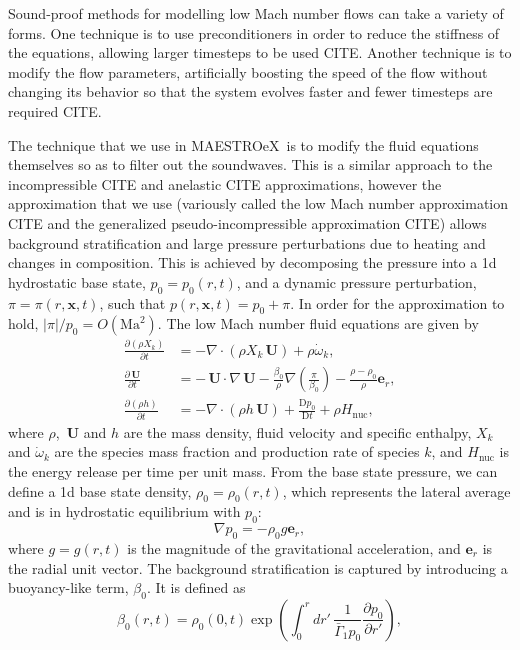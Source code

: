 \documentclass[a4paper]{jpconf}
\newcommand{\maestroex}{{\sffamily MAESTROeX}}
\newcommand{\Ub}{{\,\bm{U}}}
\newcommand{\pd}[2]{\frac{\partial #1}{\partial #2}}
\newcommand{\md}[2]{\frac{\mathrm{D} #1}{\mathrm{D} #2}}
\begin{document}
Sound-proof methods for modelling low Mach number flows can take a variety of forms. One technique is to use preconditioners in order to reduce the stiffness of the equations, allowing larger timesteps to be used CITE. Another technique is to modify the flow parameters, artificially boosting the speed of the flow without changing its behavior so that the system evolves faster and fewer timesteps are required CITE. 

The technique that we use in \maestroex~is to modify the fluid equations themselves so as to filter out the soundwaves. This is a similar approach to the incompressible CITE and anelastic CITE approximations, however the approximation that we use (variously called the low Mach number approximation  CITE and the generalized pseudo-incompressible approximation CITE) allows background stratification and large pressure perturbations due to heating and changes in composition. This is achieved by decomposing the pressure into a 1d hydrostatic base state, $p_0 = p_0(r, t)$, and a dynamic pressure perturbation, $\pi = \pi(r, \bm{x}, t)$, such that $p(r, \bm{x}, t) = p_0 + \pi$. In order for the approximation to hold, $|\pi|/p_0 = O(\mathrm{Ma}^2)$. The low Mach number fluid equations are given by 
\begin{align}
    \pd{\left(\rho X_k\right)}{t} &= - \nabla\cdot\left(\rho X_k \Ub \right) + \rho\dot{\omega}_k, \\
    \pd{\Ub}{t} &= - \Ub\cdot\nabla\Ub - \frac{\beta_0}{\rho}\nabla\left(\frac{\pi}{\beta_0}\right) - \frac{\rho - \rho_0}{\rho}\bm{e}_r,\\
    \pd{\left(\rho h\right)}{t} &= -\nabla\cdot\left(\rho h \Ub\right) + \md{p_0}{t} + \rho H_{\mathrm{nuc}},
\end{align}
where $\rho$, $\Ub$ and $h$ are the mass density, fluid velocity and specific enthalpy, $X_k$ and $\dot{\omega}_k$ are the species mass fraction and production rate of species $k$, and $H_{\mathrm{nuc}}$ is the energy release per time per unit mass. From the base state pressure, we can define a 1d base state density, $\rho_0 = \rho_0(r, t)$, which represents the lateral average and is in hydrostatic equilibrium with $p_0$:
\begin{equation}
    \nabla p_0 = -\rho_0 g \bm{e}_r,
\end{equation}
where $g = g(r,t)$ is the magnitude of the gravitational acceleration, and $\bm{e}_r$ is the radial unit vector. The background stratification is captured by introducing a buoyancy-like term, $\beta_0$. It is defined as 
\begin{equation}
    \beta_0(r,t) = \rho_0(0,t) \exp\left(\int_0^r dr'\, \frac{1}{\bar{\Gamma}_1p_0}\pd{p_0}{r'} \right),
\end{equation}
\end{document}
